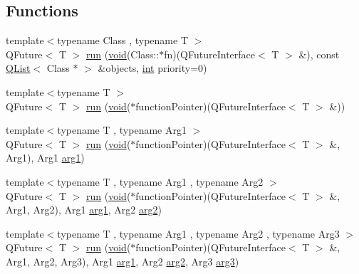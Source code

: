 \subsection*{Functions}
\begin{DoxyCompactItemize}
\item 
{\footnotesize template$<$typename Class , typename T $>$ }\\Q\-Future$<$ T $>$ \hyperlink{namespace_qt_concurrent_a3cb1fa5a72947eea010668284058b19d}{run} (\hyperlink{group___u_a_v_objects_plugin_ga444cf2ff3f0ecbe028adce838d373f5c}{void}(Class\-::$\ast$fn)(Q\-Future\-Interface$<$ T $>$ \&), const \hyperlink{class_q_list}{Q\-List}$<$ Class $\ast$ $>$ \&objects, \hyperlink{ioapi_8h_a787fa3cf048117ba7123753c1e74fcd6}{int} priority=0)
\item 
{\footnotesize template$<$typename T $>$ }\\Q\-Future$<$ T $>$ \hyperlink{namespace_qt_concurrent_a4bbd2d0ee2b94dec829f50de6786a0ad}{run} (\hyperlink{group___u_a_v_objects_plugin_ga444cf2ff3f0ecbe028adce838d373f5c}{void}($\ast$function\-Pointer)(Q\-Future\-Interface$<$ T $>$ \&))
\item 
{\footnotesize template$<$typename T , typename Arg1 $>$ }\\Q\-Future$<$ T $>$ \hyperlink{namespace_qt_concurrent_a462372bff99711567ecffdd2306a2ece}{run} (\hyperlink{group___u_a_v_objects_plugin_ga444cf2ff3f0ecbe028adce838d373f5c}{void}($\ast$function\-Pointer)(Q\-Future\-Interface$<$ T $>$ \&, Arg1), Arg1 \hyperlink{glext_8h_a4b247ab422408c1761a36f9034c2585b}{arg1})
\item 
{\footnotesize template$<$typename T , typename Arg1 , typename Arg2 $>$ }\\Q\-Future$<$ T $>$ \hyperlink{namespace_qt_concurrent_a0fa3415543c108a43b67e68694a54456}{run} (\hyperlink{group___u_a_v_objects_plugin_ga444cf2ff3f0ecbe028adce838d373f5c}{void}($\ast$function\-Pointer)(Q\-Future\-Interface$<$ T $>$ \&, Arg1, Arg2), Arg1 \hyperlink{glext_8h_a4b247ab422408c1761a36f9034c2585b}{arg1}, Arg2 \hyperlink{glext_8h_a5aee5a44bf92a9837fea48e41ef0df57}{arg2})
\item 
{\footnotesize template$<$typename T , typename Arg1 , typename Arg2 , typename Arg3 $>$ }\\Q\-Future$<$ T $>$ \hyperlink{namespace_qt_concurrent_a0019b566db0209f3467eda10c4c496c5}{run} (\hyperlink{group___u_a_v_objects_plugin_ga444cf2ff3f0ecbe028adce838d373f5c}{void}($\ast$function\-Pointer)(Q\-Future\-Interface$<$ T $>$ \&, Arg1, Arg2, Arg3), Arg1 \hyperlink{glext_8h_a4b247ab422408c1761a36f9034c2585b}{arg1}, Arg2 \hyperlink{glext_8h_a5aee5a44bf92a9837fea48e41ef0df57}{arg2}, Arg3 \hyperlink{glext_8h_a525a52cc20e1aa70741e5c7dae172f25}{arg3})

\end{DoxyCompactItemize}
